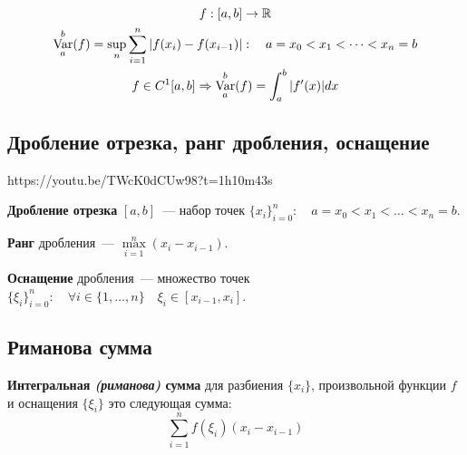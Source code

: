 \documentclass[../main.tex]{subfiles}
\begin{document}
\begin{gather*}
    f:[a,b]\to\R \\
    \operatornamewithlimits{Var}_a^b(f)=\sup_n\sum_{i=1}^{n}|f(x_i)-f(x_{i-1})|:\quad a=x_0<x_1<\dots<x_n=b\\
    f\in C^1[a,b]\Rightarrow\operatornamewithlimits{Var}_a^b(f)=\int_a^b |f'(x)|dx
\end{gather*}

\subsection{Дробление отрезка, ранг дробления, оснащение}
https://youtu.be/TWcK0dCUw98?t=1h10m43s

\textbf{Дробление отрезка} $[a,b]$~--- набор точек $\{x_i\}_{i=0}^{n}:\quad a=x_0<x_1<\dots<x_n=b$.

\textbf{Ранг} дробления~--- $\max\limits_{i=1}^{n}(x_i-x_{i-1})$.

\textbf{Оснащение} дробления~--- множество точек $\{\xi_i\}_{i=0}^{n}:\quad\forall i\in\{1,\dots,n\}\quad\xi_i\in[x_{i-1}, x_i]$.


\subsection{Риманова сумма}
\textbf{Интегральная \textit{(риманова)} сумма} для разбиения $\{x_i\}$, произвольной функции $f$ и оснащения $\{\xi_i\}$ это следующая сумма:
    $$\sum_{i=1}^n f(\xi_i)(x_i-x_{i-1})$$

\newpage
\end{document}
